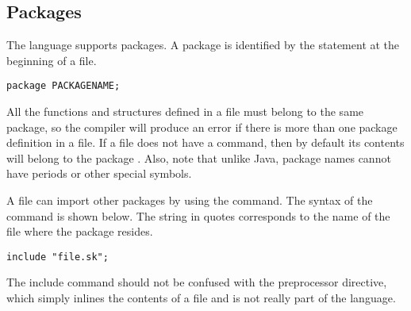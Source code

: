 \subsection{Packages}

The \Sk{} language supports packages. A package is identified by the  statement at the beginning of a file.
\begin{lstlisting}
package PACKAGENAME;
\end{lstlisting}

All the functions and structures defined in a file must belong to the same package, so the compiler will produce an error if there is more than one package definition in a file. If a file does not have a  command, then by default its contents will belong to the package . Also, note that unlike Java, package names cannot have periods or other special symbols. 

A file can import other packages by using the  command. The syntax of the command is shown below. The string in quotes corresponds to the name of the file where the package resides. 

\begin{lstlisting}
include "file.sk";
\end{lstlisting}

The include command should not be confused with the  preprocessor directive, which simply inlines the contents of a file and is not really part of the language. 


